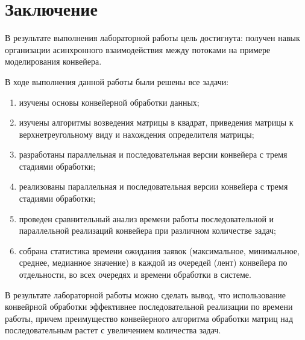 \chapter*{Заключение}

В результате выполнения лабораторной работы цель достигнута: получен навык организации асинхронного взаимодействия между потоками на примере моделирования конвейера.

В ходе выполнения данной работы были решены все задачи:
\begin{enumerate}[label={\arabic*)}]
    \item изучены основы конвейерной обработки данных;
    \item изучены алгоритмы возведения матрицы в квадрат, приведения матрицы к верхнетреугольному виду и нахождения определителя матрицы;
	\item разработаны параллельная и последовательная версии конвейера с тремя стадиями обработки;
	\item реализованы параллельная и последовательная версии конвейера с тремя стадиями обработки;
	\item проведен сравнительный анализ времени работы последовательной и параллельной реализаций конвейера при различном количестве задач;	
	\item собрана статистика времени ожидания заявок (максимальное, минимальное, среднее, медианное значение) в каждой из очередей (лент) конвейера по отдельности, во всех очередях и времени обработки в системе.
\end{enumerate}


В результате лабораторной работы можно сделать вывод, что использование конвейрной обработки эффективнее последовательной реализации по времени работы, причем преимущество конвейерного алгоритма обработки матриц над последовательным растет с увеличением количества задач.

